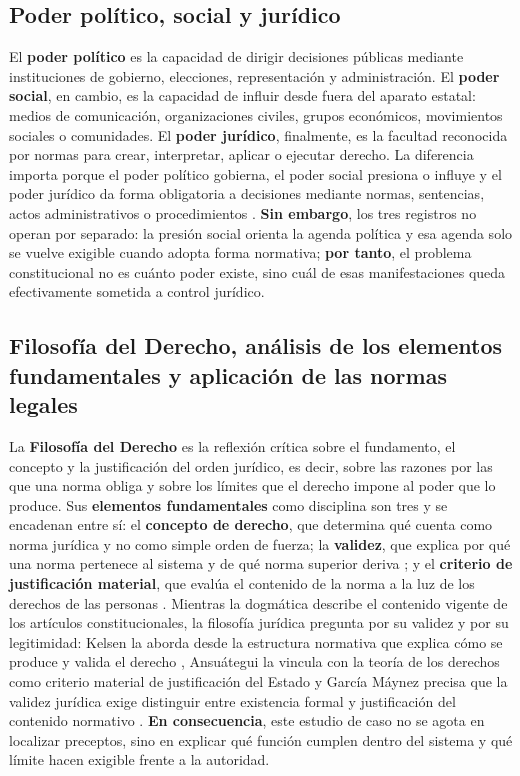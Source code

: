 \documentclass[
spanish,
letterpaper, oneside
]{article}
\begin{document}
	\subsection{Poder político, social y jurídico}
	
	El \textbf{poder político} es la capacidad de dirigir decisiones públicas mediante instituciones de gobierno, elecciones, representación y administración. El \textbf{poder social}, en cambio, es la capacidad de influir desde fuera del aparato estatal: medios de comunicación, organizaciones civiles, grupos económicos, movimientos sociales o comunidades. El \textbf{poder jurídico}, finalmente, es la facultad reconocida por normas para crear, interpretar, aplicar o ejecutar derecho. La diferencia importa porque el poder político gobierna, el poder social presiona o influye y el poder jurídico da forma obligatoria a decisiones mediante normas, sentencias, actos administrativos o procedimientos \citep{paredes2020,kelsen1982}. \textbf{Sin embargo}, los tres registros no operan por separado: la presión social orienta la agenda política y esa agenda solo se vuelve exigible cuando adopta forma normativa; \textbf{por tanto}, el problema constitucional no es cuánto poder existe, sino cuál de esas manifestaciones queda efectivamente sometida a control jurídico.
	
	\subsection{Filosofía del Derecho, análisis de los elementos fundamentales y aplicación de las normas legales}
	
	La \textbf{Filosofía del Derecho} es la reflexión crítica sobre el fundamento, el concepto y la justificación del orden jurídico, es decir, sobre las razones por las que una norma obliga y sobre los límites que el derecho impone al poder que lo produce. Sus \textbf{elementos fundamentales} como disciplina son tres y se encadenan entre sí: el \textbf{concepto de derecho}, que determina qué cuenta como norma jurídica y no como simple orden de fuerza; la \textbf{validez}, que explica por qué una norma pertenece al sistema y de qué norma superior deriva \citep{kelsen1982}; y el \textbf{criterio de justificación material}, que evalúa el contenido de la norma a la luz de los derechos de las personas \citep{ansutegui2007}. Mientras la dogmática describe el contenido vigente de los artículos constitucionales, la filosofía jurídica pregunta por su validez y por su legitimidad: Kelsen la aborda desde la estructura normativa que explica cómo se produce y valida el derecho \citep{kelsen1982}, Ansuátegui la vincula con la teoría de los derechos como criterio material de justificación del Estado \citep{ansutegui2007} y García Máynez precisa que la validez jurídica exige distinguir entre existencia formal y justificación del contenido normativo \citep{garcia2002}. \textbf{En consecuencia}, este estudio de caso no se agota en localizar preceptos, sino en explicar qué función cumplen dentro del sistema y qué límite hacen exigible frente a la autoridad.
	
\end{document}
